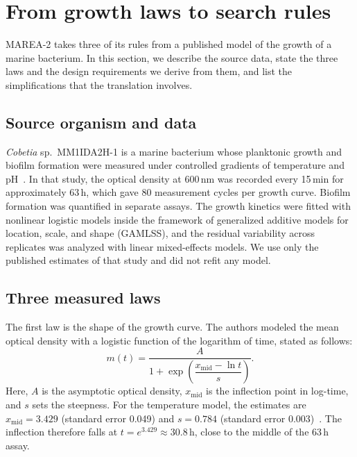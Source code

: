 \documentclass[preprint,12pt]{elsarticle}
\begin{document}
\section{From growth laws to search rules}
\label{sec:biology}

MAREA-2 takes three of its rules from a published model of the growth of a
marine bacterium. In this section, we describe the source data, state the three
laws and the design requirements we derive from them, and list the
simplifications that the translation involves.

\subsection{Source organism and data}
\label{sec:source}

\emph{Cobetia} sp.\ MM1IDA2H-1 is a marine bacterium whose planktonic growth
and biofilm formation were measured under controlled gradients of temperature
and pH~\cite{stehlik2025cobetia}. In that study, the optical density at
600\,nm was recorded every 15\,min for approximately 63\,h, which gave 80
measurement cycles per growth curve. Biofilm formation was quantified in
separate assays. The growth kinetics were fitted with nonlinear logistic models
inside the framework of generalized additive models for location, scale, and
shape (GAMLSS), and the residual variability across replicates was analyzed
with linear mixed-effects models. We use only the published estimates of that
study and did not refit any model.

\subsection{Three measured laws}
\label{sec:laws}

The first law is the shape of the growth curve. The authors modeled the mean
optical density with a logistic function of the logarithm of time, stated as
follows:
\begin{equation}
  m(t) = \frac{A}{1 + \exp\!\left(\dfrac{x_{\mathrm{mid}} - \ln t}{s}\right)}.
  \label{eq:logistic}
\end{equation}
Here, $A$ is the asymptotic optical density, $x_{\mathrm{mid}}$ is the
inflection point in log-time, and $s$ sets the steepness. For the temperature
model, the estimates are $x_{\mathrm{mid}} = 3.429$ (standard error 0.049) and
$s = 0.784$ (standard error 0.003)~\cite[Table~1]{stehlik2025cobetia}. The
inflection therefore falls at $t = e^{3.429} \approx 30.8$\,h, close to the
middle of the 63\,h assay.
\end{document}
